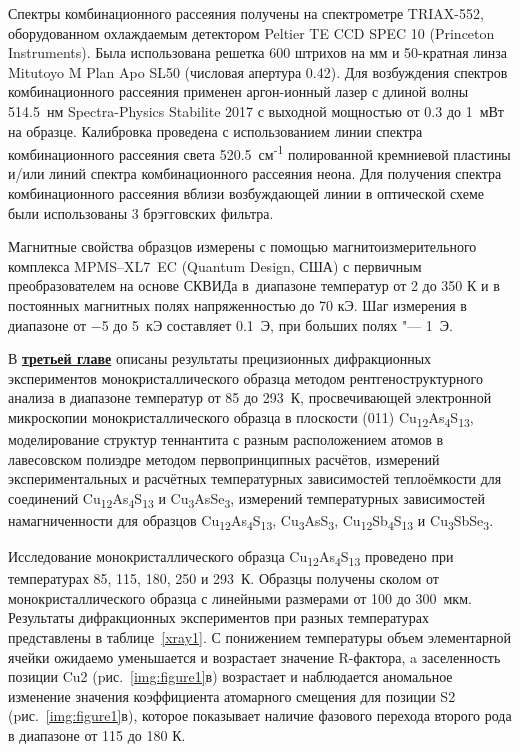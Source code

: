 Спектры комбинационного рассеяния получены на спектрометре TRIAX-552, оборудованном охлаждаемым детектором Peltier TE CCD SPEC 10 (Princeton Instruments).
Была использована решетка 600 штрихов на мм и 50-кратная линза Mitutoyo M Plan Apo SL50 (числовая апертура 0.42).
Для возбуждения спектров комбинационного рассеяния применен аргон-ионный лазер с длиной волны 514.5~нм Spectra-Physics Stabilite 2017 с выходной мощностью от 0.3 до 1~мВт на образце. Калибровка проведена с использованием линии спектра комбинационного рассеяния света 520.5~см\textsuperscript{-1} полированной кремниевой пластины и/или линий спектра комбинационного рассеяния неона.
Для получения спектра комбинационного рассеяния вблизи возбуждающей линии в оптической схеме были использованы 3  брэгговских фильтра.

Магнитные свойства образцов измерены с
помощью магнитоизмерительного комплекса
MPMS--XL7~EC (Quantum Design, США) с первичным преобразователем на основе СКВИДа в~диапазоне температур от 2 до 350 К и в постоянных магнитных полях напряженностью до 70 кЭ. Шаг измерения в диапазоне от $-$5 до 5~кЭ составляет 0.1~Э, при больших полях "--- 1~Э.

В \underline{\textbf{третьей главе}} описаны результаты прецизионных дифракционных экспериментов монокристаллического образца методом рентгеноструктурного анализа в диапазоне температур от 85 до 293~К, просвечивающей электронной микроскопии монокристаллического образца в плоскости (011) Cu\textsubscript{12}As\textsubscript{4}S\textsubscript{13},
моделирование структур теннантита с разным расположением атомов в лавесовском полиэдре методом первопринципных расчётов,
измерений экспериментальных и расчётных температурных зависимостей теплоёмкости для соединений Cu\textsubscript{12}As\textsubscript{4}S\textsubscript{13} и Cu\textsubscript{3}AsSe\textsubscript{3},
измерений температурных зависимостей намагниченности для образцов Cu\textsubscript{12}As\textsubscript{4}S\textsubscript{13}, Cu\textsubscript{3}AsS\textsubscript{3}, Cu\textsubscript{12}Sb\textsubscript{4}S\textsubscript{13} и Cu\textsubscript{3}SbSe\textsubscript{3}.



Исследование монокристаллического образца  Cu\textsubscript{12}As\textsubscript{4}S\textsubscript{13} проведено при температурах 85, 115, 180, 250 и 293~К. Образцы получены сколом от монокристаллического образца с линейными размерами от 100 до 300~мкм.  Результаты дифракционных экспериментов при разных температурах представлены в таблице~\ref{xray1}. С понижением температуры объем элементарной ячейки ожидаемо уменьшается и возрастает значение R-фактора, a  заселенность позиции Cu2 (pис.~\ref{img:figure1}в) возрастает и  наблюдается аномальное изменение значения коэффициента атомарного смещения для позиции S2 (pис.~\ref{img:figure1}в), которое показывает наличие фазового перехода второго рода в диапазоне от 115 до 180 К.

